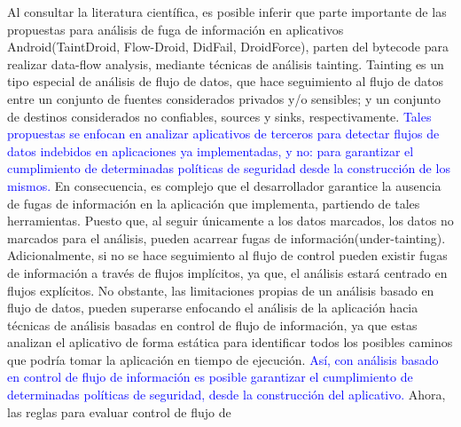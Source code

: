 Al consultar la literatura científica, es posible inferir que parte importante
de las propuestas para análisis de fuga de información en aplicativos
Android(TaintDroid\cite{TaintDroid}, Flow-Droid\cite{FlowDroid-Thesis},
DidFail\cite{DidFail}, DroidForce\cite{DroidForce}), parten del bytecode para
realizar data-flow analysis, mediante técnicas de análisis tainting. Tainting
es un tipo especial de análisis de flujo de datos, que hace seguimiento al flujo
de datos entre un conjunto de fuentes considerados privados y/o sensibles; y un
conjunto de destinos considerados no confiables, sources y sinks,
respectivamente.\newline 
\textcolor{blue}
{ Tales propuestas se enfocan en analizar aplicativos de terceros para detectar
flujos de datos indebidos en aplicaciones ya implementadas, y no: para
garantizar el cumplimiento de determinadas políticas de seguridad desde la
construcción de los mismos.}
En consecuencia, es complejo que el desarrollador
garantice la ausencia de fugas de información en la aplicación que implementa,
partiendo de tales herramientas. Puesto que, al seguir únicamente a los datos
marcados, los datos no marcados para el análisis, pueden acarrear fugas de
información(under-tainting). Adicionalmente, si no se hace seguimiento al flujo
de control pueden existir fugas de información a través de flujos implícitos,
ya que, el análisis estará centrado en flujos explícitos.\newline
No obstante, las limitaciones propias de un análisis basado en flujo de datos,
pueden superarse enfocando el análisis de la aplicación hacia técnicas de
análisis basadas en control de flujo de información, ya que estas analizan el
aplicativo de forma estática para identificar todos los posibles caminos que
podría tomar la aplicación en tiempo de ejecución. 
\textcolor{blue}
{Así, con análisis basado en
control de flujo de información es posible garantizar el cumplimiento
de determinadas políticas de seguridad, desde la construcción del
aplicativo.}\newline 
Ahora, las reglas para evaluar control de flujo de
